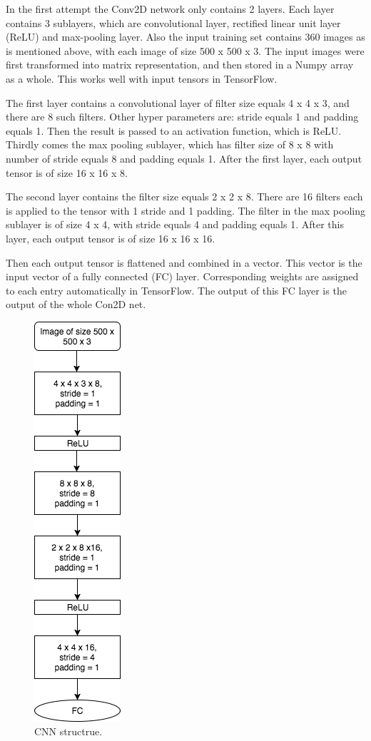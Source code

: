 \documentclass{article}
\begin{document}
In the first attempt the Conv2D network only contains 2 layers. Each layer contains 3 sublayers, which are convolutional layer, rectified linear unit layer (ReLU) and max-pooling layer. Also the input training set contains 360 images as is mentioned above, with each image of size 500 x 500 x 3. The input images were first transformed into matrix representation, and then stored in a Numpy array as a whole. This works well with input tensors in TensorFlow.

The first layer contains a convolutional layer of filter size equals 4 x 4 x 3, and there are 8 such filters. Other hyper parameters are: stride equals 1 and padding equals 1. Then the result is passed to an activation function, which is ReLU. Thirdly comes the max pooling sublayer, which has filter size of 8 x 8 with number of stride equals 8 and padding equals 1. After the first layer, each output tensor is of size 16 x 16 x 8.

The second layer contains the filter size equals 2 x 2 x 8. There are 16 filters each is applied to the tensor with 1 stride and 1 padding. The filter in the max pooling sublayer is of size 4 x 4, with stride equals 4 and padding equals 1. After this layer, each output tensor is of size 16 x 16 x 16.

Then each output tensor is flattened and combined in a vector. This vector is the input vector of a fully connected (FC) layer. Corresponding weights are assigned to each entry automatically in TensorFlow. The output of this FC layer is the output of the whole Con2D net.



\begin{figure}[ht]
  \centering
  \includegraphics[width=0.2\linewidth]{cnn_structrue_1.png}
  \caption{CNN structrue.}
  \label{cnn_structrue_1}
\end{figure}
\end{document}
